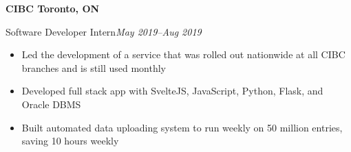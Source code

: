 \textbf{CIBC \hfill Toronto, ON}\par

Software Developer Intern\hfill \textit{May 2019--Aug 2019}
\begin{itemize}
    \item Led the development of a service that was rolled out nationwide at all CIBC branches and is still used monthly
    \item Developed full stack app with SvelteJS, JavaScript, Python, Flask, and Oracle DBMS
    \item Built automated data uploading system to run weekly on 50 million entries, saving 10 hours weekly
\end{itemize}

